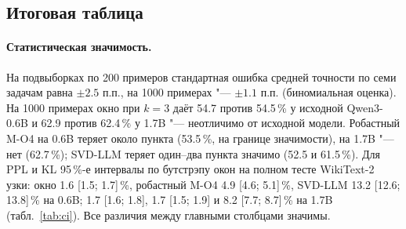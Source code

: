 \subsection{Итоговая таблица}

\begin{table}[t]
\centering
\scriptsize
\setlength{\tabcolsep}{3pt}
\caption{Qwen3-0.6B-Base, замена первых $k_{\mathrm{sink}}$ слоёв.
Столбцы: исходная модель; методы из литературы (окно+сток, позиционное
внимание, A3, SVD-LLM, окно+SVD-LLM); предложенные (O1, M-O4 с наивной
и робастной калибровкой, окно+M-O4 робастный). Бенчмарки "--- точность,
\%, подвыборки по 200 примеров (MMLU "--- 5 на подзадачу).}
\label{tab:final06}
\end{table}

\begin{table}[t]
\centering
\scriptsize
\setlength{\tabcolsep}{3pt}
\caption{Qwen3-1.7B-Base, те же столбцы, что в табл.~\ref{tab:final06}.}
\label{tab:final17}
\end{table}

\paragraph{Статистическая значимость.} На подвыборках по 200 примеров
стандартная ошибка средней точности по семи задачам равна $\pm2.5$ п.п.,
на 1000 примерах "--- $\pm1.1$ п.п. (биномиальная оценка). На 1000 примерах
окно при $k=3$ даёт 54.7 против 54.5\,\% у исходной Qwen3-0.6B и 62.9
против 62.4\,\% у 1.7B "--- неотличимо от исходной модели. Робастный M-O4
на 0.6B теряет около пункта (53.5\,\%, на границе значимости), на 1.7B
"--- нет (62.7\,\%); SVD-LLM теряет один--два пункта значимо (52.5 и
61.5\,\%). Для PPL и KL 95\,\%-е интервалы по бутстрэпу окон на полном
тесте WikiText-2 узки: окно 1.6 [1.5; 1.7]\,\%, робастный M-O4 4.9
[4.6; 5.1]\,\%, SVD-LLM 13.2 [12.6; 13.8]\,\% на 0.6B; 1.7 [1.6; 1.8], 1.7
[1.5; 1.9] и 8.2 [7.7; 8.7]\,\% на 1.7B (табл.~\ref{tab:ci}). Все
различия между главными столбцами значимы.

\begin{table}[t]
\centering
\scriptsize
{}
\caption{Qwen3-0.6B, $k=3$: рост PPL и KL на полном тесте WikiText-2 с
95\,\%-ми интервалами по бутстрэпу окон (283 окна по 1024 токена).}
\label{tab:ci}
\end{table}

